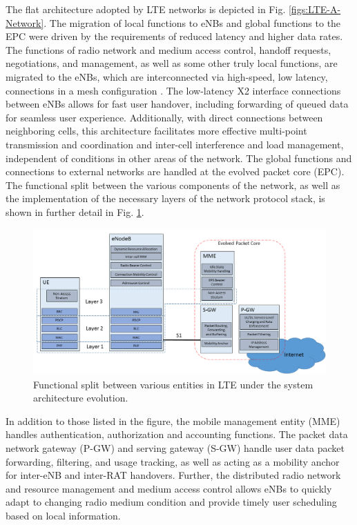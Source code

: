 The flat architecture adopted by LTE networks is depicted in Fig. \ref{figs:LTE-A-Network}.  The migration of local functions to eNBs and global functions to the EPC were driven by the requirements of reduced latency and higher data rates. The functions of radio network and medium access control, handoff requests, negotiations, and management, as well as some other truly local functions, are migrated to the eNBs, which are interconnected via high-speed, low latency, connections in a mesh configuration \cite{tr36300}.  The low-latency X2 interface connections between eNBs allows for fast user handover, including forwarding of queued data for seamless user experience.  Additionally, with direct connections between neighboring cells, this architecture facilitates more effective multi-point transmission and coordination and inter-cell interference and load management, independent of conditions in other areas of the network. The global functions and connections to external networks are handled at the evolved packet core (EPC). The functional split between the various components of the network, as well as the implementation of the necessary layers of the network protocol stack, is shown in further detail in Fig. \ref{figs:funcSplit}.
\begin{figure}[!Ht]
	\centering
	\includegraphics[width=\textwidth]{figures3/LTE-decomp}
	\caption{Functional split between various entities in LTE under the system architecture evolution.}
	\label{figs:funcSplit}
\end{figure}
In addition to those listed in the figure, the mobile management entity (MME) handles authentication, authorization and accounting functions.  The packet data network gateway (P-GW) and serving gateway (S-GW) handle user data packet forwarding, filtering, and usage tracking, as well as acting as a mobility anchor for inter-eNB and inter-RAT handovers.  Further, the distributed radio network and resource management and medium access control allows eNBs to quickly adapt to changing radio medium condition and provide timely user scheduling based on local information.

